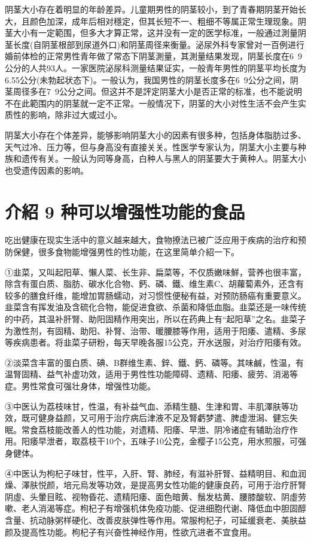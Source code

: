 \documentclass[12pt,UTF8]{ctexbook}
\begin{document}
阴茎大小存在着明显的年龄差异。儿童期男性的阴茎较小，到了青春期阴茎开始长大，且颜色加深，成年后相对穩定，但其长短不一、粗细不等属正常生理现象。阴茎大小有一定範围，但多大才算正常，这并没有一定的医学标准，一般通过測量阴茎长度(自阴茎根部到尿道外口)和阴茎周径来衡量。泌尿外科专家曾对一百例进行婚前体检的正常男性青年做了常态下阴茎測量，其測量结果发现，阴茎长度在6~9公分的人共93人。一家医院泌尿科测量结果证实，一般青年男性的阴茎平均长度为6.55公分(未勃起状态下)。一般认为，我国男性的阴茎长度多在6~9公分之间，阴茎周径多在7~9公分之间。但这并不是評定阴茎大小是否正常的标准，也不能说明不在此範围内的阴茎就一定不正常。一般情况下，阴茎的大小对性生活不会产生实质性的影响，除非过大或过小。

阴茎大小存在个体差异，能够影响阴茎大小的因素有很多种，包括身体脂肪过多、天气过冷、压力等，但与身高没有直接关关。性医学专家认为，阴茎大小主要与种族和遗传有关。一般认为同等身高，白种人与黑人的阴茎要大于黄种人。阴茎大小也受遗传因素的影响。

\section{介紹 9 种可以增强性功能的食品}

吃出健康在现实生活中的意义越来越大，食物撩法已被广泛应用于疾病的治疗和预防保健，很多食物能增强男性的性功能，在这里简单介紹一下。

①韭菜，又叫起阳草、懶人菜、长生非、扁菜等，不仅质嫩味鮮，营养也很丰富，除含有蛋白质、脂肪、碳水化合物、鈣、磷、鐵、维生素C、胡蘿蔔素外，还含有较多的膳食纤维，能增加胃肠蠕动，对习惯性便秘有益，对预防肠癌有重要意义。韭菜含有挥发油及含硫化合物，能促进食欲、杀菌和降低血脂。韭菜还是一味传统的中药，其温补肝腎、助阳固精作用突出，所以在药典上有“起阳草”之名。韭菜子为激性剂，有固精、助阳、补腎、治带、暖腰膝等作用，适用于阳痿、遣精、多尿等疾病患者。将韭菜子研粉，每天早晚各服15公克，开水送服，对治疗阳痿有效。

②淡菜含丰富的蛋白质、碘、B群维生素、鋅、鐵、鈣、磷等。其味鹹，性温，有温腎固精、益气补虚功效，适用于男性性功能障碍、遗精、阳痿、疲劳、消渴等症。男性常食可强壮身体，增强性功能。

③中医认为荔枝味甘，性温，有补益气血、添精生髓、生津和胃、丰肌澤肤等功效，既可健身益颜，又可用于治疗病后津液不足及腎虧梦遣、脾虚泄潟、健忘失眠。常食荔枝能改善人的性功能，对遗精、阳痿、早泄、阴冷诸症有辅助治疗作用。阳痿早泄者，取荔枝干10个，五味子10公克，金樱子15公克，用水煎服，可强身健体。

④中医认为枸杞子味甘，性平，入肝、腎、肺经，有滋补肝腎、益精明目、和血润燥、澤肤悦颜，培元烏发等功效，是提高男女性功能的健康良药，可用于治疗肝腎阴虛、头暈目眩、视物昏花、遗精阳痿、面色暗黄、鬚发枯黄、腰膝酸软、阴虛劳嗽、老人消渴等症。枸杞子有增强机体免疫功能、促进细胞代谢、降低血中胆固醇含量、抗动脉粥样硬化、改善皮肤弹性等作用。常服枸杞子，可延缓衰老、美肤益颜及提高性功能。枸杞子有兴奋性神经作用，性欲亢进者不宜食用。
\end{document}
